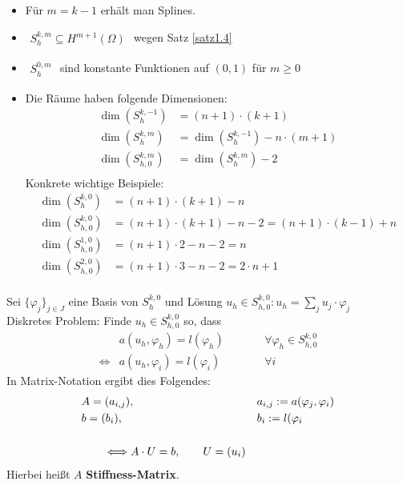 \begin{bemerkung}\
	\begin{itemize}
		\item Für $m=k-1$ erhält man Splines.
		\item $\begin{aligned}
			S_h^{k,m}\subseteq H^{m+1}(\Omega)
		\end{aligned}$ wegen Satz \ref{satz1.4}
		\item $\begin{aligned}
			S_h^{0,m}
		\end{aligned}$ sind konstante Funktionen auf $(0,1)$ für $m\geq0$
		\item Die Räume haben folgende Dimensionen:
		\begin{align*}
			\dim\left(S_h^{k,-1}\right)&=(n+1)\cdot(k+1)\\
			\dim\left(S_h^{k,m}\right)&=\dim\left(S_h^{k,-1}\right)-n\cdot(m+1)\\
			\dim\left(S_{h,0}^{k,m}\right)&=\dim\left(S_h^{k,m}\right)-2\\
		\end{align*}
		Konkrete wichtige Beispiele:
		\begin{align*}
			\dim\left(S_h^{k,0}\right)&=(n+1)\cdot(k+1)-n\\
			\dim\left(S_{h,0}^{k,0}\right)&=(n+1)\cdot(k+1)-n-2=(n+1)\cdot(k-1)+n\\
			\dim\left(S_{h,0}^{1,0}\right)&=(n+1)\cdot 2-n-2=n\\
			\dim\left(S_{h,0}^{2,0}\right)&=(n+1)\cdot 3-n-2=2\cdot n+1\\
		\end{align*}
	\end{itemize}
\end{bemerkung}

Sei $\lbrace\varphi_j\rbrace_{j\in J}$ eine Basis von $S_h^{k,0}$
und Lösung $u_h\in S_{h,0}^{k,0}: u_h=\sum\limits_j u_j\cdot\varphi_j$\\
Diskretes Problem: Finde $u_h\in S_{h,0}^{k,0}$ so, dass 
\begin{align*}
	&a(u_h,\varphi_h)=l(\varphi_h)&\qquad&\forall \varphi_h\in S_{h,0}^{k,0}\\
	\Longleftrightarrow &a(u_h,\varphi_i)=l(\varphi_i)&\qquad&\forall i
\end{align*}
In Matrix-Notation ergibt dies Folgendes:
\begin{align*}
	&A=(a_{i,j}),&&a_{i,j}:=a(\varphi_j,\varphi_i)\\
	&b=(b_i),&&b_i:=l(\varphi_i\nl
	&\qquad\Longleftrightarrow A\cdot U=b,\qquad U=(u_i)
\end{align*}
Hierbei heißt $A$ \textbf{Stiffness-Matrix}.

